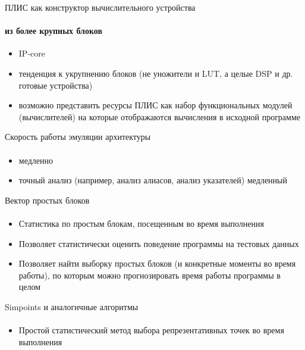 \documentclass{beamer}              %
\begin{document}
\begin{frame}{ПЛИС как конструктор вычислительного устройства}
  \framesubtitle{из более крупных блоков}
  
  \begin{itemize}
      \item IP-core
      \item тенденция к укрупнению блоков (не уножители и LUT, а целые DSP и др. готовые устройства) 
      \item возможно представить ресурсы ПЛИС как набор функциональных модулей (вычислителей) на которые отображаются вычисления в исходной программе
 \end{itemize}
  
\end{frame}

\begin{frame}{Скорость работы эмуляции архитектуры}
  \framesubtitle{}
  
  \begin{itemize}
      \item медленно
      \item точный анализ (например, анализ алиасов, анализ указателей) медленный
  \end{itemize}

\end{frame}

\begin{frame}{Вектор простых блоков}
  \framesubtitle{}
  
  \begin{itemize}
      \item Статистика по простым блокам, посещенным во время выполнения
      \item Позволяет статистически оценить поведение программы на тестовых данных
      \item Позволяет найти выборку простых блоков (и конкретные моменты во время работы), по которым можно прогнозировать время работы программы в целом
  \end{itemize}
  
\end{frame}


\begin{frame}{Simpoints и аналогичные алгоритмы}
  \framesubtitle{}
  
  \begin{itemize}
      \item Простой статистический метод выбора репрезентативных точек во время выполнения
      
  \end{itemize}
  
\end{frame}
\end{document}

